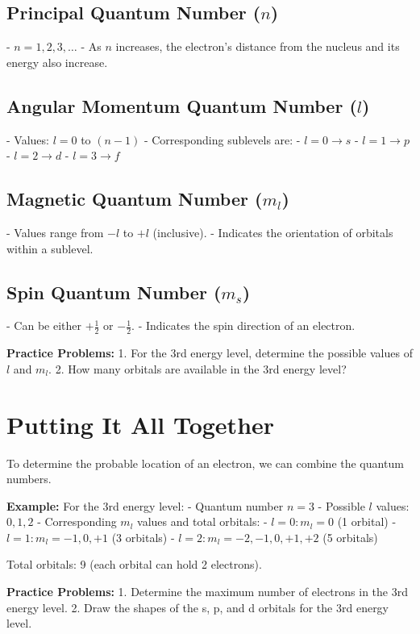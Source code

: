 \documentclass{article}
\begin{document}
\subsection*{Principal Quantum Number ($n$)}
- $n = 1, 2, 3, \ldots$
- As $n$ increases, the electron's distance from the nucleus and its energy also increase.

\subsection*{Angular Momentum Quantum Number ($l$)}
- Values: $l = 0$ to $(n-1)$
- Corresponding sublevels are:
    - $l = 0 \rightarrow s$
    - $l = 1 \rightarrow p$
    - $l = 2 \rightarrow d$
    - $l = 3 \rightarrow f$

\subsection*{Magnetic Quantum Number ($m_l$)}
- Values range from $-l$ to $+l$ (inclusive).
- Indicates the orientation of orbitals within a sublevel.

\subsection*{Spin Quantum Number ($m_s$)}
- Can be either $+\frac{1}{2}$ or $-\frac{1}{2}$.
- Indicates the spin direction of an electron.

\textbf{Practice Problems:}
1. For the 3rd energy level, determine the possible values of $l$ and $m_l$.
2. How many orbitals are available in the 3rd energy level?

\section*{Putting It All Together}
To determine the probable location of an electron, we can combine the quantum numbers.

\textbf{Example:}
For the 3rd energy level:
- Quantum number $n = 3$
- Possible $l$ values: $0, 1, 2$
- Corresponding $m_l$ values and total orbitals:
    - $l = 0: m_l = 0$ (1 orbital)
    - $l = 1: m_l = -1, 0, +1$ (3 orbitals)
    - $l = 2: m_l = -2, -1, 0, +1, +2$ (5 orbitals)

Total orbitals: 9 (each orbital can hold 2 electrons).

\textbf{Practice Problems:}
1. Determine the maximum number of electrons in the 3rd energy level.
2. Draw the shapes of the s, p, and d orbitals for the 3rd energy level.
\end{document}
